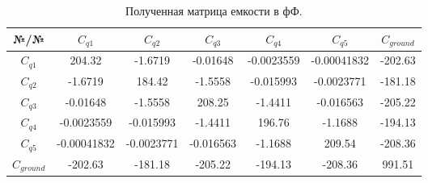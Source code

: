 \documentclass[a0, portrait]{a0poster}
\begin{document}
	
	
		\begin{table}
		
		\begin{tabular}{|c|c|c|c|c|c|c|}
			\hline
			№/№ & $C_{q1}$ & $C_{q2}$ & $C_{q3}$ & $C_{q4}$ & $C_{q5}$ & $C_{ground}$ \\
			\hline
			$C_{q1}$ & 204.32 & -1.6719 & -0.01648 & -0.0023559 & -0.00041832 & -202.63  \\
			\hline
			$C_{q2}$ & -1.6719 & 184.42 & -1.5558 & -0.015993 & -0.0023771 & -181.18\\ 
			\hline
			$C_{q3}$  & -0.01648 & -1.5558 & 208.25 & -1.4411 & -0.016563 & -205.22\\
			\hline
			$C_{q4}$  & -0.0023559 & -0.015993 & -1.4411 & 196.76 & -1.1688 & -194.13\\
			\hline
			$C_{q5}$  & -0.00041832 & -0.0023771 & -0.016563 & -1.1688 & 209.54 & -208.36\\
			\hline
			$C_{ground}$  & -202.63 & -181.18 & -205.22 & -194.13 & -208.36 & 991.51\\
			\hline
		\end{tabular}
		\caption{Полученная матрица емкости в фФ.}
		\label{table:cap_matrix}
	\end{table}
\end{document}
